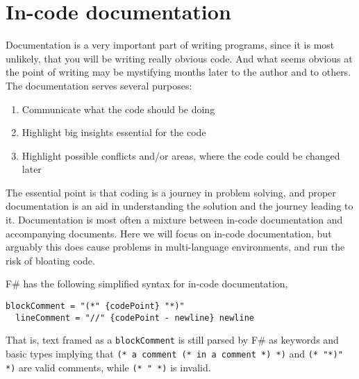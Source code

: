 \section{In-code documentation}
Documentation is a very important part of writing programs, since it is most unlikely, that you will be writing really obvious code. And what seems obvious at the point of writing may be mystifying months later to the author and to others. The documentation serves several purposes:
\begin{enumerate}
\item Communicate what the code should be doing
\item Highlight big insights essential for the code
\item Highlight possible conflicts and/or areas, where the code could be changed later
\end{enumerate}
The essential point is that coding is a journey in problem solving, and proper documentation is an aid in understanding the solution and the journey leading to it. Documentation is most often a mixture between in-code documentation and accompanying documents. Here we will focus on in-code documentation, but arguably this does cause problems in multi-language environments, and run the risk of bloating code.

F\# has the following simplified syntax for in-code documentation,
\begin{lstlisting}[language=ebnf]
  blockComment = "(*" {codePoint} "*)"
  lineComment = "//" {codePoint - newline} newline
\end{lstlisting}
That is, text framed as a \lstinline[language=ebnf]!blockComment! is still parsed by F\# as keywords and basic types implying that \lstinline!(* a comment (* in a comment *) *)! and \lstinline!(* "*)" *)! are valid comments, while \lstinline!(* " *)! is invalid.

